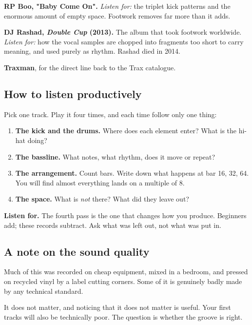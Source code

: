 \textbf{RP Boo, "Baby Come On".} \emph{Listen for:} the triplet kick patterns and the enormous amount
of empty space. Footwork removes far more than it adds.

\textbf{DJ Rashad, \emph{Double Cup} (2013).} The album that took footwork worldwide. \emph{Listen for:}
how the vocal samples are chopped into fragments too short to carry meaning, and used purely
as rhythm. Rashad died in 2014.

\textbf{Traxman}, for the direct line back to the Trax catalogue.

\subsection{How to listen productively}\label{li01_canon-how-to-listen-productively}

Pick one track. Play it four times, and each time follow only one thing:

\begin{enumerate}
\def\labelenumi{\arabic{enumi}.}
\tightlist
\item
  \textbf{The kick and the drums.} Where does each element enter? What is the hi-hat doing?
\item
  \textbf{The bassline.} What notes, what rhythm, does it move or repeat?
\item
  \textbf{The arrangement.} Count bars. Write down what happens at bar 16, 32, 64. You will find
  almost everything lands on a multiple of 8.
\item
  \textbf{The space.} What is \emph{not} there? What did they leave out?
\end{enumerate}

\begin{listenbox}
\textbf{Listen for.} The fourth pass is the one that changes how you produce. Beginners add;
these records subtract. Ask what was left out, not what was put in.
\end{listenbox}

\subsection{A note on the sound quality}\label{li01_canon-a-note-on-the-sound-quality}

Much of this was recorded on cheap equipment, mixed in a bedroom, and pressed on recycled
vinyl by a label cutting corners. Some of it is genuinely badly made by any technical
standard.

It does not matter, and noticing that it does not matter is useful. Your first tracks will
also be technically poor. The question is whether the groove is right.
